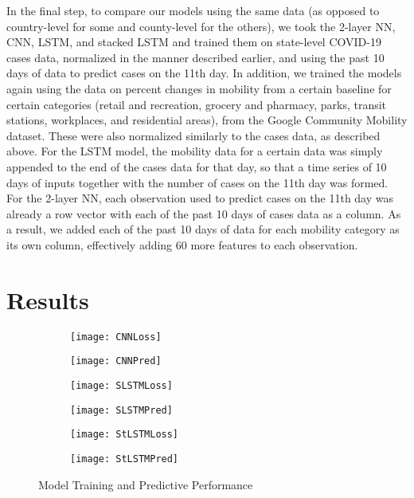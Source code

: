 ﻿\documentclass{article}
\begin{document}
\begin{multicols}{2}
In the final step, to compare our models using the same data (as opposed to
country-level for some and county-level for the others), we took the 2-layer NN,
CNN, LSTM, and stacked LSTM and trained them on state-level COVID-19 cases data,
normalized in the manner described earlier, and using the past 10 days of data
to predict cases on the 11th day. In addition, we trained the models again using
the data on percent changes in mobility from a certain baseline for certain
categories (retail and recreation, grocery and pharmacy, parks, transit
stations, workplaces, and residential areas), from the Google Community Mobility
dataset. These were also normalized similarly to the cases data, as described
above. For the LSTM model, the mobility data for a certain data was simply
appended to the end of the cases data for that day, so that a time series of 10
days of inputs together with the number of cases on the 11th day was formed. For
the 2-layer NN, each observation used to predict cases on the 11th day was
already a row vector with each of the past 10 days of cases data as a column. As
a result, we added each of the past 10 days of data for each mobility category
as its own column, effectively adding 60 more features to each observation.

\end{multicols}

\section*{Results}

  \begin{figure}[!htb]
    \begin{subfigure}{.5\textwidth}
      \centering
      \texttt{[image: CNNLoss]}
      \label{fig:sfig1}
    \end{subfigure}
    \begin{subfigure}{.5\textwidth}
      \centering
      \texttt{[image: CNNPred]}
      \label{fig:sfig2}
    \end{subfigure}
    \begin{subfigure}{.5\textwidth}
      \centering
      \texttt{[image: SLSTMLoss]}
      \label{fig:sfig3}
    \end{subfigure}
    \begin{subfigure}{.5\textwidth}
      \centering
      \texttt{[image: SLSTMPred]}
      \label{fig:sfig4}
    \end{subfigure}
    \begin{subfigure}{.5\textwidth}
      \centering
      \texttt{[image: StLSTMLoss]}
      \label{fig:sfig5}
    \end{subfigure}
    \begin{subfigure}{.5\textwidth}
      \centering
      \texttt{[image: StLSTMPred]}
      \label{fig:sfig6}
    \end{subfigure}
    \caption{Model Training and Predictive Performance}
    \label{fig:fig1}
  \end{figure}
\end{document}
